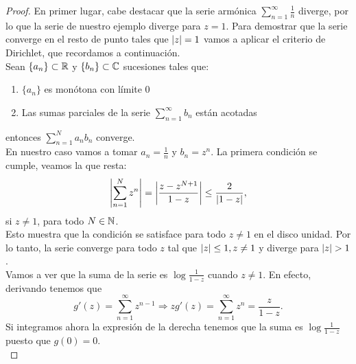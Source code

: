 \begin{proof}
    En primer lugar, cabe destacar que la serie armónica $\sum_{n=1}^{\infty} \frac{1}{n}$ diverge, por lo que la serie de nuestro ejemplo diverge para $z = 1$. Para demostrar que la serie converge en el resto de punto tales que $\left\lvert z\right\rvert = 1$ vamos a aplicar el criterio de Dirichlet, que recordamos a continuación. \\

    Sean $\{a_n\} \subset \mathbb{R}$ y $\{b_n\} \subset \mathbb{C}$ sucesiones tales que:
    \begin{enumerate}
        \item $\{a_n\}$ es monótona con límite $0$
        \item Las sumas parciales de la serie $\sum_{n=1}^{\infty} b_n$ están acotadas
    \end{enumerate}
    entonces $\sum_{n=1}^{N} a_nb_n$ converge. \\

    En nuestro caso vamos a tomar $a_n = \frac{1}{n}$ y $b_n = z^n$. La primera condición se cumple, veamos la que resta:
    \begin{equation*}
        \left\lvert\sum_{n=1}^{N} z^n\right\rvert = \left\lvert\frac{z - z^{N+1}}{1 - z}\right\rvert \leq \frac{2}{\left\lvert1 - z\right\rvert},
    \end{equation*}
    si $z \neq 1$, para todo $N \in \mathbb{N}$. \\

    Esto muestra que la condición se satisface para todo $z \not = 1$ en el disco unidad. Por lo tanto, la serie converge para todo $z$ tal que $\left\lvert z\right\rvert \leq 1, z \not = 1$ y diverge para $\left\lvert z\right\rvert > 1$. \\

    Vamos a ver que la suma de la serie es $\log{\frac{1}{1 - z}}$ cuando $z \not = 1$. En efecto, derivando tenemos que
    \begin{equation*}
        g'(z) = \sum_{n=1}^{\infty} z^{n-1} \Rightarrow z g'(z) = \sum_{n=1}^{\infty} z^n = \frac{z}{1 - z}.
     \end{equation*}
     Si integramos ahora la expresión de la derecha tenemos que la suma es $\log{\frac{1}{1 - z}}$ puesto que $g(0) = 0$. \\ %


\end{proof}
